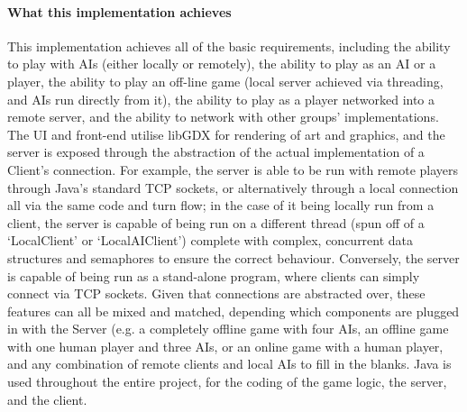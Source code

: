 \documentclass[a4paper,doc,draftfirst]{apa6}
\begin{document}
\paragraph{What this implementation achieves}
This implementation achieves all of the basic requirements, including the ability to play with AIs (either locally or remotely), the ability to play as an AI or a player, the ability to play an off-line game (local server achieved via threading, and AIs run directly from it), the ability to play as a player networked into a remote server, and the ability to network with other groups’ implementations. The UI and front-end utilise libGDX for rendering of art and graphics, and the server is exposed through the abstraction of the actual implementation of a Client’s connection. For example, the server is able to be run with remote players through Java’s standard TCP sockets, or alternatively through a local connection all via the same code and turn flow; in the case of it being locally run from a client, the server is capable of being run on a different thread (spun off of a ‘LocalClient’ or ‘LocalAIClient’) complete with complex, concurrent data structures and semaphores to ensure the correct behaviour. Conversely, the server is capable of being run as a stand-alone program, where clients can simply connect via TCP sockets. Given that connections are abstracted over, these features can all be mixed and matched, depending which components are plugged in with the Server (e.g. a completely offline game with four AIs, an offline game with one human player and three AIs, or an online game with a human player, and any combination of remote clients and local AIs to fill in the blanks. Java is used throughout the entire project, for the coding of the game logic, the server, and the client.
\end{document}
